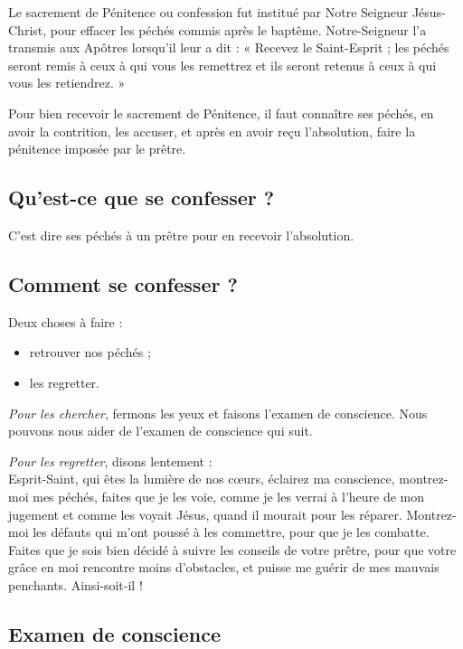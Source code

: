 \newcommand{\commandement}[1]{\needspace{3\baselineskip}\noindent\textbf{#1}}

Le sacrement de Pénitence ou confession fut institué par Notre Seigneur Jésus-Christ, pour effacer les péchés commis après le baptême. Notre-Seigneur l’a transmis aux Apôtres lorsqu’il leur a dit : « Recevez le Saint-Esprit ; les péchés seront remis à ceux à qui vous les remettrez et ils seront retenus à ceux à qui vous les retiendrez. »



Pour bien recevoir le sacrement de Pénitence, il faut connaître ses péchés, en avoir la contrition, les accuser, et après en avoir reçu l’absolution, faire la pénitence imposée par le prêtre.

\subsection*{Qu’est-ce que se confesser ?}

C’est dire ses péchés à un prêtre pour en recevoir l’absolution.

\subsection*{Comment se confesser ?}

Deux choses à faire :
\begin{itemize}
\item retrouver nos péchés ;
\item les regretter.
\end{itemize}

\emph{Pour les chercher}, fermons les yeux et faisons l’examen de conscience. Nous pouvons nous aider de l’examen de conscience qui suit.
\pagebreak[3]

\emph{Pour les regretter}, disons lentement :\\
Esprit-Saint, qui êtes la lumière de nos cœurs, éclairez ma conscience, montrez-moi mes péchés, faites que je les voie, comme je les verrai à l’heure de mon jugement et comme les voyait Jésus, quand il mourait pour les réparer. Montrez-moi les défauts qui m’ont poussé à les commettre, pour que je les combatte. Faites que je sois bien décidé à suivre les conseils de votre prêtre, pour que votre grâce en moi rencontre moins d’obstacles, et puisse me guérir de mes mauvais penchants. Ainsi-soit-il !

\subsection*{Examen de conscience}

